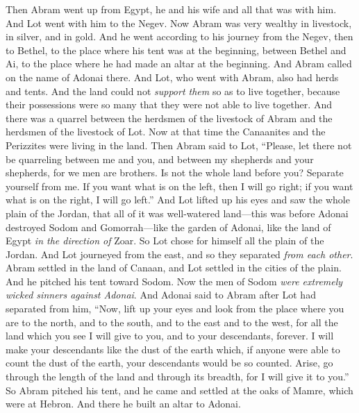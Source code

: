 \begin{biblechapter} %
 Then Abram went up from Egypt, he and his wife and all that was with him. And Lot went with him to the Negev.
\verse Now Abram was very wealthy in livestock, in silver, and in gold.
\verse And he went according to his journey from the Negev, then to Bethel, to the place where his tent was at the beginning, between Bethel and Ai,
\verse to the place where he had made an altar at the beginning. And Abram called on the name of Adonai there.
\verse And Lot, who went with Abram, also had herds and tents.
\verse And the land could not \textit{support them} so as to live together, because their possessions were so many that they were not able to live together.
\verse And there was a quarrel between the herdsmen of the livestock of Abram and the herdsmen of the livestock of Lot. Now at that time the Canaanites and the Perizzites were living in the land.
\verse Then Abram said to Lot, “Please, let there not be quarreling between me and you, and between my shepherds and your shepherds, for we men are brothers.
\verse Is not the whole land before you? Separate yourself from me. If you want what is on the left, then I will go right; if you want what is on the right, I will go left.”
\verse And Lot lifted up his eyes and saw the whole plain of the Jordan, that all of it was well-watered land—this was before Adonai destroyed Sodom and Gomorrah—like the garden of Adonai, like the land of Egypt \textit{in the direction of} Zoar.
\verse So Lot chose for himself all the plain of the Jordan. And Lot journeyed from the east, and so they separated \textit{from each other}.
\verse Abram settled in the land of Canaan, and Lot settled in the cities of the plain. And he pitched his tent toward Sodom.
\verse Now the men of Sodom \textit{were extremely wicked sinners against Adonai}.
\verse And Adonai said to Abram after Lot had separated from him, “Now, lift up your eyes and look from the place where you are to the north, and to the south, and to the east and to the west,
\verse for all the land which you see I will give to you, and to your descendants, forever.
\verse I will make your descendants like the dust of the earth which, if anyone were able to count the dust of the earth, your descendants would be so counted.
\verse Arise, go through the length of the land and through its breadth, for I will give it to you.”
\verse So Abram pitched his tent, and he came and settled at the oaks of Mamre, which were at Hebron. And there he built an altar to Adonai.
\end{biblechapter}

